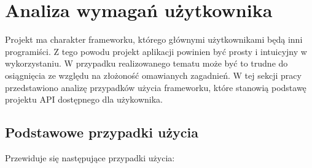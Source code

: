 \documentclass[12pt]{article}
\begin{document}
\section{Analiza wymagań użytkownika}

Projekt ma charakter frameworku, którego głównymi użytkownikami będą inni programiści. Z tego powodu projekt aplikacji powinien być prosty i intuicyjny w wykorzystaniu. W przypadku realizowanego tematu może być to trudne do osiągnięcia ze względu na złożoność omawianych zagadnień. W tej sekcji pracy przedstawiono analizę przypadków użycia frameworku, które stanowią podstawę projektu API dostępnego dla użykownika.

\subsection{Podstawowe przypadki użycia}

Przewiduje się następujące przypadki użycia:
\end{document}
